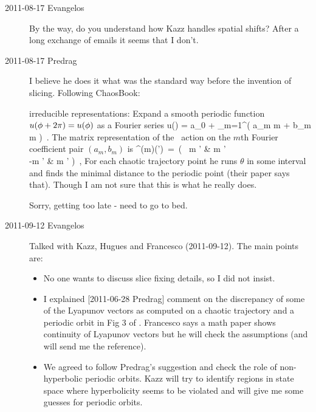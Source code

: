 \begin{description}
\item[2011-08-17 Evangelos]
  By the way, do you understand how Kazz handles spatial shifts? After a
  long exchange of emails it seems that I don't.

\item[2011-08-17 Predrag]
  I believe he does it what was the standard way before the invention of
  slicing. Following ChaosBook:

  { irreducible representations:}
  Expand a smooth periodic function $u({\bf \phi} + 2\pi) =
  u({\bf \phi})$ as a Fourier series
  \beq
  u(\gSpace) = a_0 + \sum_{m=1}^\infty \left(
    a_m \cos m \gSpace + b_m \sin m \gSpace
  \right)
  \,.
  The matrix representation of the \ action
  on the $m$th Fourier coefficient pair
  $(a_m,b_m)$ is
  \beq
  \LieEl^{(m)}(\gSpace') \,=\,  \left(
    ~\cos m \gSpace'  & \sin m \gSpace' \\
    -\sin m \gSpace'  & \cos m \gSpace'
    \earr\right)
  \,,
  For each chaotic trajectory point he runs $\theta$ in some interval and
  finds the minimal distance to the periodic point (their paper says that).
  Though I am not sure that this is what he really does.

  Sorry, getting too late - need to go to bed.

\item[2011-09-12 Evangelos] Talked with Kazz, Hugues and Francesco (2011-09-12).
  The main points are:
  \begin{itemize}
  \item No one wants to discuss slice fixing details, so I did not insist.
  \item I explained [2011-06-28 Predrag] comment on the discrepancy of some of the
    Lyapunov vectors as computed on a chaotic trajectory and a periodic
    orbit in Fig 3 of . Francesco says a math paper shows
    continuity of Lyapunov vectors but he will check the assumptions
    (and will send me the reference).
  \item We agreed to follow Predrag's suggestion and check the
    role of non-hyper\-bolic periodic orbits. Kazz will try to identify
    regions in state space where hyper\-bolicity seems to
    be violated and will give me some guesses for periodic orbits.
  \end{itemize}


\end{description}
